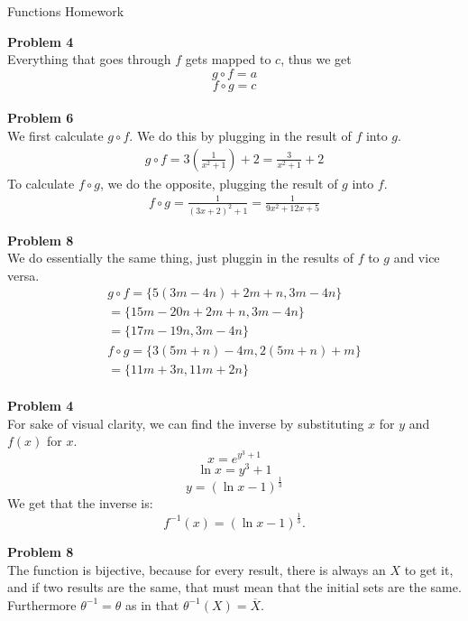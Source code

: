 \documentclass[12pt]{article}
\begin{document}
\begin{center} 
\Large
Functions Homework  
\end{center}

\noindent
\textbf{Problem 4}\\

\noindent
Everything that goes through $f$ gets mapped to $c$, thus we get
 $$g \circ f = a$$ 
 $$f \circ g = c$$ \\
 
\noindent
\textbf{Problem 6}\\

\noindent
We first calculate $g \circ f$. We do this by plugging in the result of $f$ into $g$.
\begin{align*}
	g \circ f = 3(\frac{1}{x^2+1})+2
	= \frac{3}{x^2+1}+2
\end{align*}
To calculate $f \circ g$, we do the opposite, plugging the result of $g$ into $f$.
\begin{align*}
	f \circ g = \frac{1}{(3x+2)^2 + 1}
	= \frac{1}{9x^2+12x+5}
\end{align*}

\noindent
\textbf{Problem 8}\\

\noindent
We do essentially the same thing, just pluggin in the results of $f$ to $g$ and vice
versa.
\begin{align*}
g \circ f = \{5(3m-4n) + 2m+n, 3m-4n\}\\
= \{15m-20n + 2m+n, 3m-4n\}\\
= \{17m - 19n, 3m-4n\}\\
f \circ g = \{3(5m+n)-4m, 2(5m+n) + m\}\\
= \{11m + 3n, 11m + 2n\}
\end{align*}\\

\noindent
\textbf{Problem 4}\\

\noindent
For sake of visual clarity, we can find the inverse by substituting $x$ for $y$ and $f(x)$
for $x$.
$$x = e^{y^3 + 1}$$ 
$$\ln x = y^3 + 1$$ 
$$y = (\ln x - 1)^{\frac{1}{3}} $$
We get that the inverse is: 
\[
	f^{-1}(x) = (\ln x - 1)^{\frac{1}{3}}
.\] 

\noindent
\textbf{Problem 8} \\

\noindent
The function is bijective, because for every result, there is always an $X$ to get it, and if
two results are the same, that must mean that the initial sets are the same. Furthermore 
$\theta^{-1} = \theta$ as in that $\theta^{-1}(X) = \overline{X}$. \\
\end{document}
